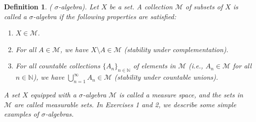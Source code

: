 \documentclass{article}
\newtheorem{definition}{Definition}
\begin{document}
    \begin{definition}
        ( $\sigma$-algebra). Let $X$ be a set. A collection $\mathcal{M}$ of subsets of $X$ is called a $\sigma$-algebra if the following properties are satisfied:
\begin{enumerate}
\item[$(\Sigma 1)$] $X \in \mathcal{M}$.
\item[$(\Sigma 2)$] For all $A \in \mathcal{M}$, we have $X \setminus A \in \mathcal{M}$ (stability under complementation).
\item[$(\Sigma 3)$] For all countable collections $\{A_n\}_{n\in\mathbb{N}}
$ of elements in $\mathcal{M}$ (i.e., $A_n \in \mathcal{M}$ for all $n \in \mathbb{N}$), we have $\bigcup_{n=1}^{\infty} A_n \in \mathcal{M}$ (stability under countable unions).
\end{enumerate}

A set $X$ equipped with a $\sigma$-algebra $\mathcal{M}$ is called a measure space, and the sets in $\mathcal{M}$ are called measurable sets. In Exercises 1 and 2, we describe some simple examples of $\sigma$-algebras.
    \end{definition}
\end{document}
